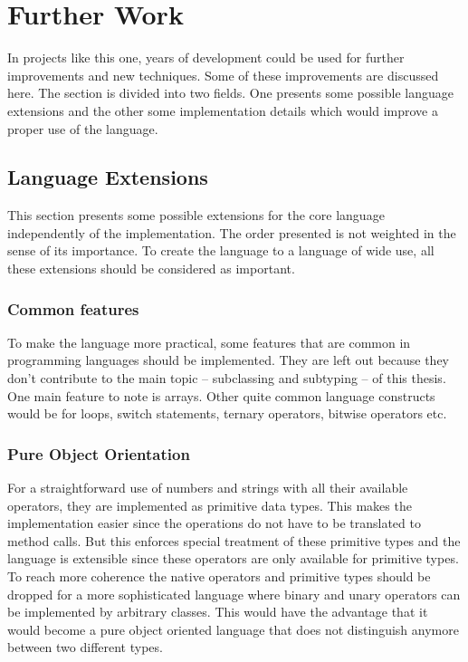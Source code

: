 \section{Further Work}
\label{sec:futureWork}
In projects like this one, years of development could be used for
further improvements and new techniques. Some of these improvements are
discussed here. The section is divided into two fields. One presents some
possible language extensions and the other some implementation details
which would improve a proper use of the language.

\subsection{Language Extensions}
This section presents some possible extensions for the core language
independently of the implementation. The order presented is not weighted
in the sense of its importance. To create the language to a language
of wide use, all these extensions should be considered as important.

\subsubsection{Common features}
To make the language more practical, some features that are common
in programming languages should be implemented. They are left out
because they don't contribute to the main topic -- subclassing and subtyping --
of this thesis.
One main feature to note is arrays. Other quite common language constructs
would be for loops, switch statements, ternary operators, bitwise operators
etc.

\subsubsection{Pure Object Orientation}
For a straightforward use of numbers and strings with all their available
operators, they are implemented as primitive data types. This makes the
implementation easier since the operations do not have to be translated
to method calls. But this enforces special treatment of these primitive types
and the language is extensible since these operators are only available for primitive
types. To reach more coherence the native operators and primitive types should
be dropped for a more sophisticated language where binary and unary operators can be
implemented by arbitrary classes. This would have the advantage that it
would become a pure object oriented language that does not distinguish anymore
between two different types.

